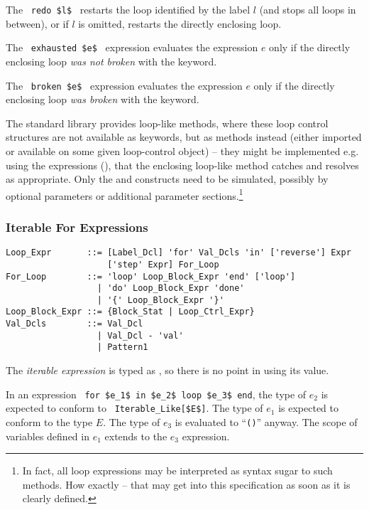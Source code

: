 The ~\lstinline!redo $l$!~ restarts the loop identified by the label $l$ (and stops all loops in between), or if $l$ is omitted, restarts the directly enclosing loop. 

The ~\lstinline!exhausted $e$!~ expression evaluates the expression $e$ only if the directly enclosing loop {\em was not broken} with the  keyword. 

The ~\lstinline!broken $e$!~ expression evaluates the expression $e$ only if the directly enclosing loop {\em was broken} with the  keyword. 

The standard library provides loop-like methods, where these loop control structures are not available as keywords, but as methods instead (either imported or available on some given loop-control object) -- they might be implemented e.g. using the  expressions (), that the enclosing loop-like method catches and resolves as appropriate. Only the  and  constructs need to be simulated, possibly by optional parameters or additional parameter sections.\footnote{In fact, all loop expressions may be interpreted as syntax sugar to such methods. How exactly -- that may get into this specification as soon as it is clearly defined.} 





\subsubsection{Iterable For Expressions}
\label{sec:iterable-expressions}

\syntax\begin{lstlisting}
Loop_Expr       ::= [Label_Dcl] 'for' Val_Dcls 'in' ['reverse'] Expr 
                    ['step' Expr] For_Loop
For_Loop        ::= 'loop' Loop_Block_Expr 'end' ['loop']
                  | 'do' Loop_Block_Expr 'done'
                  | '{' Loop_Block_Expr '}'
Loop_Block_Expr ::= {Block_Stat | Loop_Ctrl_Expr}
Val_Dcls        ::= Val_Dcl
                  | Val_Dcl - 'val'
                  | Pattern1
\end{lstlisting}

The {\em iterable expression} is typed as , so there is no point in using its value. 

In an expression ~\lstinline!for $e_1$ in $e_2$ loop $e_3$ end!, the type of $e_2$ is expected to conform to ~\lstinline!Iterable_Like[$E$]!. The type of $e_1$ is expected to conform to the type $E$. The type of $e_3$ is evaluated to ``\lstinline!()!'' anyway. The scope of variables defined in $e_1$ extends to the $e_3$ expression. 

